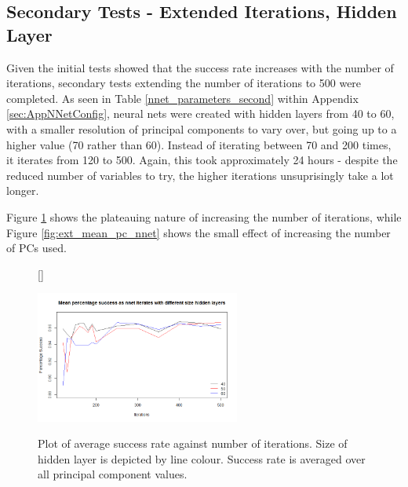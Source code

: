 \documentclass[11pt]{article} %
\begin{document}
%
%

\subsection{Secondary Tests - Extended Iterations, Hidden Layer}

Given the initial tests showed that the success rate increases with the number of iterations, secondary tests extending the number of iterations to 500 were completed. As seen in Table \ref{nnet_parameters_second} within Appendix \ref{sec:AppNNetConfig}, neural nets were created with hidden layers from 40 to 60, with a smaller resolution of principal components to vary over, but going up to a higher value (70 rather than 60). Instead of iterating between 70 and 200 times, it iterates from 120 to 500. Again, this took approximately 24 hours - despite the reduced number of variables to try, the higher iterations unsuprisingly take a lot longer. 

Figure \ref{fig:ext_mean_nnet} shows the plateauing nature of increasing the number of iterations, while Figure \ref{fig:ext_mean_pc_nnet} shows the small effect of increasing the number of PCs used. 

\begin{figure}[htb!]
[\FBwidth]
{\caption{Plot of average success rate against number of iterations. Size of hidden layer is depicted by line colour. Success rate is averaged over all principal component values. }\label{fig:ext_mean_nnet}}
{\includegraphics[width=0.6\textwidth]{nnet_extend_iter_mean.png}}
\end{figure}
\end{document}
